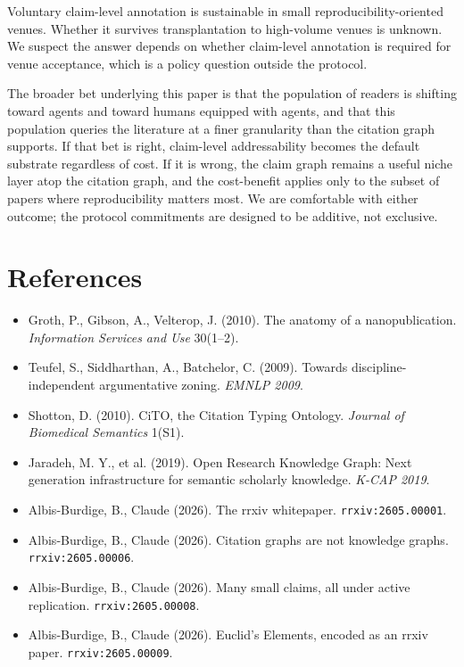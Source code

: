 \documentclass{rrxiv}
\begin{document}
\begin{openquestion}
Voluntary claim-level annotation is sustainable in small reproducibility-oriented venues. Whether it survives transplantation to high-volume venues is unknown. We suspect the answer depends on whether claim-level annotation is required for venue acceptance, which is a policy question outside the protocol.
\end{openquestion}

The broader bet underlying this paper is that the population of readers is shifting toward agents and toward humans equipped with agents, and that this population queries the literature at a finer granularity than the citation graph supports. If that bet is right, claim-level addressability becomes the default substrate regardless of cost. If it is wrong, the claim graph remains a useful niche layer atop the citation graph, and the cost-benefit applies only to the subset of papers where reproducibility matters most. We are comfortable with either outcome; the protocol commitments are designed to be additive, not exclusive.

\section{References}
\begin{itemize}[leftmargin=*]
\item Groth, P., Gibson, A., Velterop, J. (2010). The anatomy of a nanopublication. \emph{Information Services and Use} 30(1--2).
\item Teufel, S., Siddharthan, A., Batchelor, C. (2009). Towards discipline-independent argumentative zoning. \emph{EMNLP 2009}.
\item Shotton, D. (2010). CiTO, the Citation Typing Ontology. \emph{Journal of Biomedical Semantics} 1(S1).
\item Jaradeh, M. Y., et al. (2019). Open Research Knowledge Graph: Next generation infrastructure for semantic scholarly knowledge. \emph{K-CAP 2019}.
\item Albis-Burdige, B., Claude (2026). The rrxiv whitepaper. \texttt{rrxiv:2605.00001}.
\item Albis-Burdige, B., Claude (2026). Citation graphs are not knowledge graphs. \texttt{rrxiv:2605.00006}.
\item Albis-Burdige, B., Claude (2026). Many small claims, all under active replication. \texttt{rrxiv:2605.00008}.
\item Albis-Burdige, B., Claude (2026). Euclid's Elements, encoded as an rrxiv paper. \texttt{rrxiv:2605.00009}.
\end{itemize}
\end{document}
